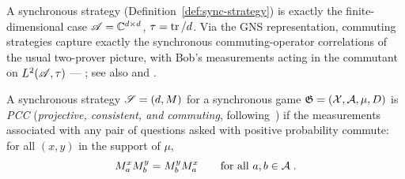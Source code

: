 \begin{remark}
A synchronous strategy (Definition~\ref{def:sync-strategy}) is exactly the
finite-dimensional case $\mathscr{A} = \mathbb{C}^{d \times d}$, $\tau = \operatorname{tr}/d$. Via the GNS
representation, commuting strategies capture exactly the synchronous
commuting-operator correlations of the usual two-prover picture, with Bob's
measurements acting in the commutant on $L^2(\mathscr{A}, \tau)$ --- \cite[Theorem
5.5]{PSSTW16}; see also \cite{Lin23} and \cite[Section 3.4]{Lin25}.
\end{remark}

\begin{definition}
\label{def:pcc}
\leanok
\qlib{}
A synchronous strategy $\mathscr{S} = (d, M)$ for a synchronous game $\mathfrak{G} = (\mathcal{X},
\mathcal{A}, \mu, D)$ is \emph{PCC} (\emph{projective, consistent, and commuting},
following~\cite[Section 5.2]{JNVWY20}) if the measurements associated with any pair
of questions asked with positive probability commute: for all $(x, y)$ in the support
of $\mu$,
\begin{equation*}
  M^x_a M^y_b = M^y_b M^x_a \qquad \text{for all } a, b \in \mathcal{A}\;.
\end{equation*}
\end{definition}


